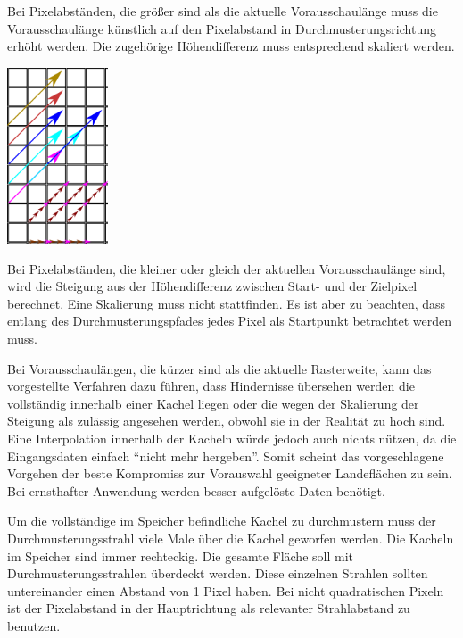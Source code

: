 \documentclass[
11pt, %
a4paper, %
oneside, %
pdfspacing, %
headinclude,
BCOR5mm, %
ngerman, %
bibtotocnumbered,
]{scrartcl}
\begin{document}
	Bei Pixelabständen, die größer sind als die aktuelle Vorausschaulänge muss die Vorausschaulänge künstlich auf den Pixelabstand in Durchmusterungsrichtung erhöht werden. Die zugehörige Höhendifferenz muss entsprechend skaliert werden. 
	
	 	\begin{minipage}{\textwidth}
		\skippingparagraph
		
		\begin{minipage}[t]{3cm}
			\vspace{0pt}
			\centering
			\includegraphics[width=3cm]{./drawings/Vorausschaulaengen.png}
		\end{minipage}
			\begin{minipage}[t]{\textwidth-3cm}
				\vspace{0pt}
				Bei Pixelabständen, die kleiner oder gleich der aktuellen Vorausschaulänge sind, wird die Steigung aus der Höhendifferenz zwischen Start- und der Zielpixel berechnet. Eine Skalierung muss nicht stattfinden. Es ist aber zu beachten, dass entlang des Durchmusterungspfades jedes Pixel als Startpunkt betrachtet werden muss.			
		\end{minipage}\skippingparagraph
	\end{minipage}

	Bei Vorausschaulängen, die kürzer sind als die aktuelle Rasterweite, kann das vorgestellte Verfahren dazu führen, dass Hindernisse übersehen werden die vollständig innerhalb einer Kachel liegen oder die wegen der Skalierung der Steigung als zulässig angesehen werden, obwohl sie in der Realität zu hoch sind. Eine Interpolation innerhalb der Kacheln würde jedoch auch nichts nützen, da die Eingangsdaten einfach "`nicht mehr hergeben"'. Somit scheint das vorgeschlagene Vorgehen der beste Kompromiss zur Vorauswahl geeigneter Landeflächen zu sein. Bei ernsthafter Anwendung werden besser aufgelöste Daten benötigt.
	
	\skippingparagraph
	
	Um die vollständige im Speicher befindliche Kachel zu durchmustern muss der Durchmusterungsstrahl viele Male über die Kachel geworfen werden. Die Kacheln im Speicher sind immer rechteckig. Die gesamte Fläche soll mit Durchmusterungsstrahlen überdeckt werden. Diese einzelnen Strahlen sollten untereinander einen Abstand von 1 Pixel haben. Bei nicht quadratischen Pixeln ist der Pixelabstand in der Hauptrichtung als relevanter Strahlabstand zu benutzen.
	
\end{document}
